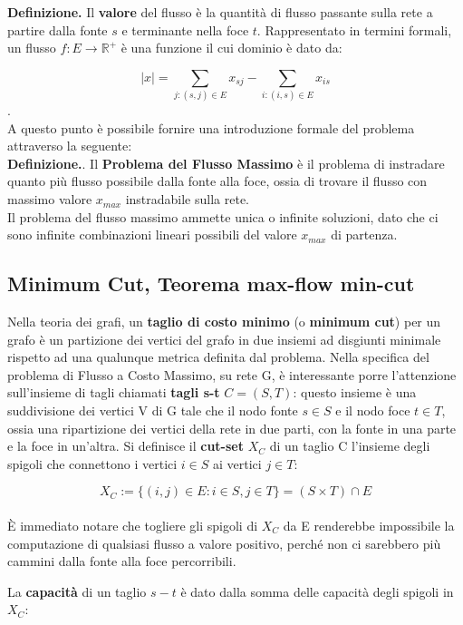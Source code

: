 \documentclass{article}
\begin{document}
\textbf{Definizione.} Il \textbf{valore} del flusso è la quantità di flusso passante sulla rete a partire dalla fonte $s$ e terminante nella foce $t$. Rappresentato in 
termini formali, un flusso $f : E \rightarrow \mathbb{R}^+$ è una funzione il cui dominio è dato da:

\[ \lvert x \rvert = \sum_{j: (s,j) \in E} x_{sj} - \sum_{i: (i,s) \in E} x_{is}\] .\\

A questo punto è possibile fornire una introduzione formale del problema attraverso la seguente:\\

\textbf{Definizione.}. Il \textbf{Problema del Flusso Massimo} è il problema di instradare quanto più flusso possibile dalla fonte alla foce, ossia di trovare il flusso 
con massimo valore $x_{max}$ instradabile sulla rete. \\

Il problema del flusso massimo ammette unica o infinite soluzioni, dato che ci sono infinite combinazioni lineari possibili del valore $x_{max}$ di partenza.


\subsection{Minimum Cut, Teorema max-flow min-cut}
Nella teoria dei grafi, un \textbf{taglio di costo minimo} (o \textbf{minimum cut}) per un grafo è un partizione dei vertici del grafo in due insiemi ad disgiunti minimale rispetto
ad una qualunque metrica definita dal problema. Nella specifica del problema di Flusso a Costo Massimo, su rete G, è interessante porre l'attenzione sull'insieme di tagli chiamati 
\textbf{tagli s-t} $C = (S,T)$: questo insieme è una suddivisione dei vertici V di G tale che il nodo fonte $s \in S$ e il nodo foce $t \in T$, ossia una ripartizione dei vertici
della rete in due parti, con la fonte in una parte e la foce in un'altra. 
Si definisce il \textbf{cut-set} $X_C$ di un taglio C l'insieme degli spigoli che connettono i vertici $i \in S$ ai vertici $j \in T$:

\[X_C := \{(i, j) \in E : i \in S, j \in T \} = (S \times T) \cap E\] \\

È immediato notare che togliere gli spigoli di $X_C$ da E renderebbe impossibile la computazione di qualsiasi flusso a valore positivo, perché non ci sarebbero più cammini dalla 
fonte alla foce percorribili.

La \textbf{capacità} di un taglio $s-t$ è dato dalla somma delle capacità degli spigoli in $X_C$:
\end{document}
